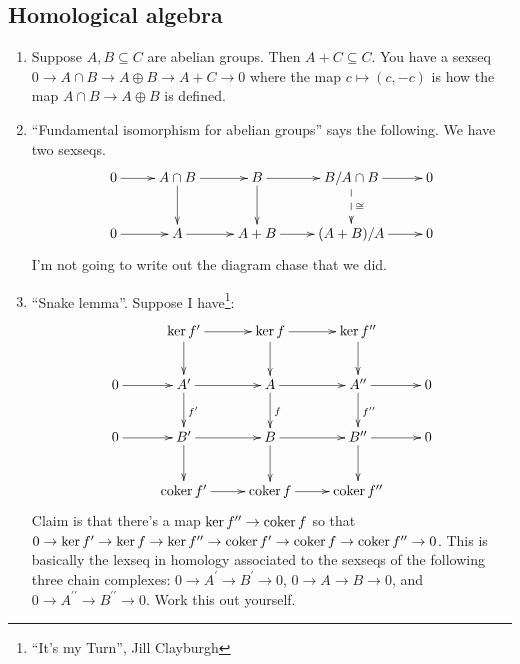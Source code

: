 \subsection{Homological algebra}
\begin{enumerate}
\item Suppose $A,B\subseteq C$ are abelian groups. Then $A+C\subseteq C$. You have a sexseq $0\to A\cap B\to A\oplus B\to A+C\to 0$ where the map $c\mapsto (c,-c)$ is how the map $A\cap B\to A\oplus B$ is defined.
\item ``Fundamental isomorphism for abelian groups'' says the following. We have two sexseqs.
	\begin{equation*}
	\xymatrix{0\ar[r] & A\cap B\ar[r]\ar[d] & B\ar[r]\ar[d] & B/A\cap B\ar[r]\ar@{-->}[d]^\cong & 0\\
	0\ar[r] & A\ar[r] & A+B\ar[r] & (A+B)/A\ar[r] & 0}
	\end{equation*}
	I'm not going to write out the diagram chase that we did.
\item ``Snake lemma''. Suppose I have\footnote{``It's my Turn'', Jill Clayburgh}:
	\begin{equation*}
	\xymatrix{ & \ker f^\prime\ar[r]\ar[d] & \ker f\ar[r]\ar[d] & \ker f^{\prime\prime}\ar[d]\\
	0\ar[r] & A^\prime\ar[r]\ar[d]^{f^\prime} & A\ar[r]\ar[d]^f & A^{\prime\prime}\ar[r]\ar[d]^{f^{\prime\prime}} & 0\\
	0\ar[r] & B^\prime\ar[r]\ar[d] & B\ar[r]\ar[d] & B^{\prime\prime}\ar[r]\ar[d] & 0\\
	 & \coker f^\prime\ar[r] & \coker f\ar[r] & \coker f^{\prime\prime}}
	\end{equation*}
	Claim is that there's a map $\ker f^{\prime\prime}\to\operatorname{coker} f$ so that $0\to \ker f^\prime\to \ker f\to \ker f^{\prime\prime}\to\operatorname{coker} f^\prime\to\operatorname{coker} f\to \operatorname{coker} f^{\prime\prime}\to 0$. This is basically the lexseq in homology associated to the sexseqs of the following three chain complexes: $0\to A^\prime\to B^\prime\to 0$, $0\to A\to B\to 0$, and $0\to A^{\prime\prime}\to B^{\prime\prime}\to 0$. Work this out yourself.
\end{enumerate}
